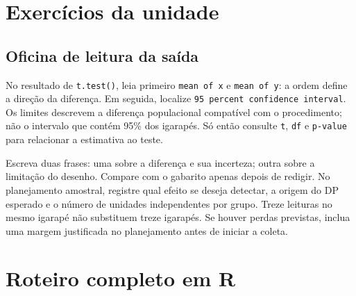 \section{Exercícios da unidade}
\begin{enumerate}
\end{enumerate}
\subsection*{Oficina de leitura da saída}
No resultado de \texttt{t.test()}, leia primeiro \texttt{mean of x} e \texttt{mean of y}: a ordem define a direção da diferença. Em seguida, localize \texttt{95 percent confidence interval}. Os limites descrevem a diferença populacional compatível com o procedimento; não o intervalo que contém 95\% dos igarapés. Só então consulte \texttt{t}, \texttt{df} e \texttt{p-value} para relacionar a estimativa ao teste.

Escreva duas frases: uma sobre a diferença e sua incerteza; outra sobre a limitação do desenho. Compare com o gabarito apenas depois de redigir. No planejamento amostral, registre qual efeito se deseja detectar, a origem do DP esperado e o número de unidades independentes por grupo. Treze leituras no mesmo igarapé não substituem treze igarapés. Se houver perdas previstas, inclua uma margem justificada no planejamento antes de iniciar a coleta.
\clearpage
\section{Roteiro completo em R}

